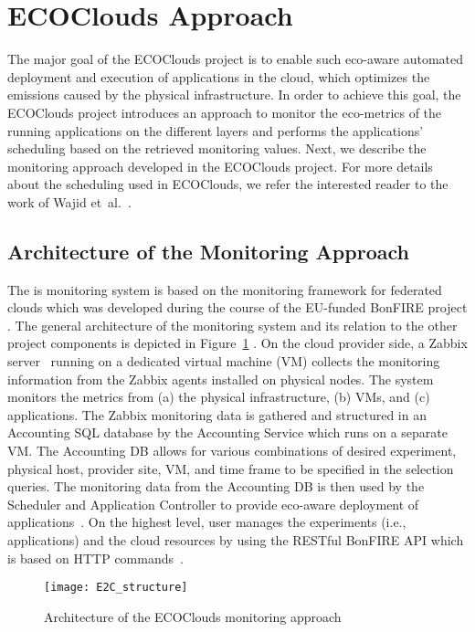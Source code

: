 \documentclass[10pt,letterpaper]{IEEEtran}
\begin{document}
 \section{ECOClouds Approach}
\label{sec:e2c_approach}

\noindent
The major goal of the ECOClouds project is to enable such eco-aware automated
deployment and execution of applications in the cloud,
which optimizes the  emissions caused by the physical infrastructure.
In order to achieve this goal, the ECOClouds project introduces an approach to monitor the eco-metrics
of the running applications on the different layers
and performs the applications' scheduling based on the retrieved monitoring values.
Next, we describe the monitoring approach developed in the ECOClouds project.
For more details about the scheduling used in ECOClouds, we refer the interested reader to the work of Wajid et~al.~\cite{Wajid2015}.

\subsection{Architecture of the \ECO Monitoring Approach}

The is \ECO monitoring system is based on the monitoring framework for federated clouds
which was developed during the course of the EU-funded BonFIRE project \cite{HazmiCM12}.
The general architecture of the \ECO monitoring system and its relation
to the other project components is depicted in Figure~\ref{fig:E2C_structure} \cite{TenschertSG14}.
On the cloud provider side, a Zabbix server~\cite{Zabbix} running on a dedicated virtual machine (VM)
collects the monitoring information from the Zabbix agents installed on physical nodes.
The system monitors the metrics from (a) the physical infrastructure, (b) VMs, and (c) applications.
The Zabbix monitoring data is gathered and structured in an Accounting SQL database by
the Accounting Service which runs on a separate VM.
The Accounting DB allows for various combinations of desired experiment,
physical host, provider site, VM, and time frame to be specified in the selection queries. 
The monitoring data from the Accounting DB is then used by the \ECO
Scheduler and Application Controller to provide eco-aware deployment of applications~\cite{Wajid2015}.
On the highest level, user manages the experiments (i.e., applications) and the cloud resources
by using the RESTful BonFIRE API which is based on HTTP commands~\cite{bonfireAPI}.

\begin{figure}
  \begin{center}
    \texttt{[image: E2C\_structure]}
    \caption{Architecture of the ECOClouds monitoring approach \cite{TenschertSG14}}
    \label{fig:E2C_structure}
  \end{center}
\end{figure}
\end{document}
